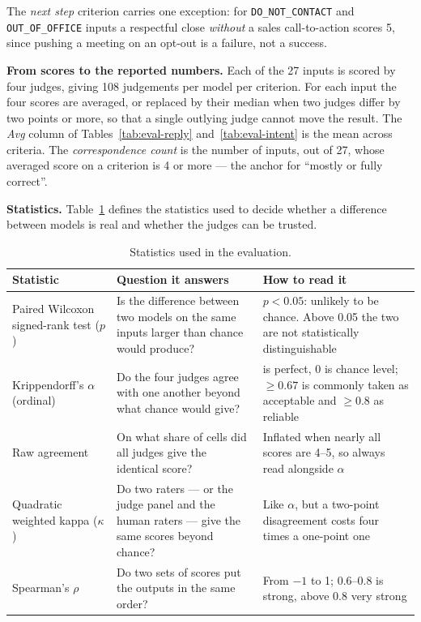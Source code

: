 \documentclass[a4paper]{article}
\begin{document}
The \textit{next step} criterion carries one exception: for
\texttt{DO\_NOT\_CONTACT} and \texttt{OUT\_OF\_OFFICE} inputs a respectful close
\emph{without} a sales call-to-action scores 5, since pushing a meeting on an
opt-out is a failure, not a success.

\textbf{From scores to the reported numbers.} Each of the 27 inputs is scored
by four judges, giving 108 judgements per model per criterion. For each input
the four scores are averaged, or replaced by their median when two judges differ
by two points or more, so that a single outlying judge cannot move the result.
The \emph{Avg} column of Tables~\ref{tab:eval-reply} and~\ref{tab:eval-intent}
is the mean across criteria. The \emph{correspondence count} is the number of
inputs, out of 27, whose averaged score on a criterion is 4 or more --- the
anchor for ``mostly or fully correct''.

\textbf{Statistics.} Table~\ref{tab:stat-defs} defines the statistics used to
decide whether a difference between models is real and whether the judges can
be trusted.

\begin{table}[H]
\centering
\caption{Statistics used in the evaluation.}
\label{tab:stat-defs}
\small
\begin{tabularx}{\textwidth}{>{\raggedright\arraybackslash}p{3.2cm} >{\raggedright\arraybackslash}X >{\raggedright\arraybackslash}X}
\toprule
\textbf{Statistic} & \textbf{Question it answers} & \textbf{How to read it} \\
\midrule
Paired Wilcoxon signed-rank test ($p$) & Is the difference between two models on the same inputs larger than chance would produce? & $p<0.05$: unlikely to be chance. Above 0.05 the two are not statistically distinguishable \\
Krippendorff's $\alpha$ (ordinal) & Do the four judges agree with one another beyond what chance would give? & 1 is perfect, 0 is chance level; $\geq 0.67$ is commonly taken as acceptable and $\geq 0.8$ as reliable \\
Raw agreement & On what share of cells did all judges give the identical score? & Inflated when nearly all scores are 4--5, so always read alongside $\alpha$ \\
Quadratic weighted kappa ($\kappa$) & Do two raters --- or the judge panel and the human raters --- give the same scores beyond chance? & Like $\alpha$, but a two-point disagreement costs four times a one-point one \\
Spearman's $\rho$ & Do two sets of scores put the outputs in the same order? & From $-1$ to 1; 0.6--0.8 is strong, above 0.8 very strong \\
\bottomrule
\end{tabularx}
\end{table}
\end{document}
